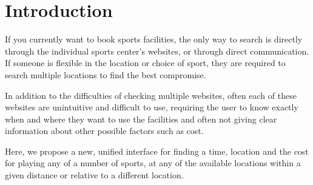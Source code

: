 \section{Introduction}
\label{sec:introduction}

If you currently want to book sports facilities, the only way to search
is directly through the individual sports center's websites, or through
direct communication. If someone is flexible in the location or choice
of sport, they are required to search multiple locations to find the
best compromise.

In addition to the difficulties of checking multiple websites, often
each of these websites are unintuitive and difficult to use, requiring
the user to know exactly when and where they want to use the facilities
and often not giving clear information about other possible factors
such as cost.

Here, we propose a new, unified interface for finding a time, location
and the cost for playing any of a number of sports, at any of the
available locations within a given distance or relative to a different
location.

